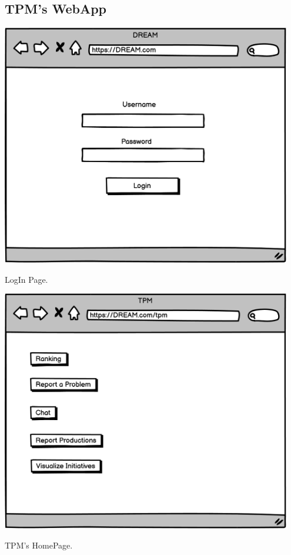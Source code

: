 \subsection{TPM's WebApp}
\vspace{0.5cm}
\begin{minipage}{.5\textwidth}
	\centering
	\includegraphics[width=0.95\textwidth]{Images/Mockup/TPM/01LoginPage.png}
	\captionsetup{type=figure}
	\caption{LogIn Page.}
\end{minipage}%
\begin{minipage}{.5\textwidth}
	\centering
	\includegraphics[width=0.95\textwidth]{Images/Mockup/TPM/02TPMHomepage.png}
	\captionsetup{type=figure}
	\caption{TPM's HomePage.}
\end{minipage}
